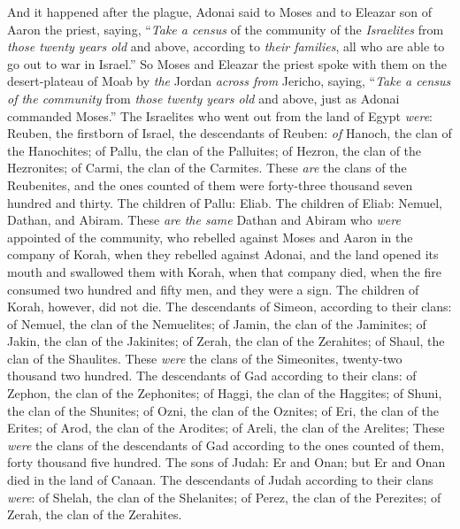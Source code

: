 \begin{biblechapter} %
  And it happened after the plague, Adonai said to Moses and to Eleazar son of Aaron the priest, saying,
\verse “\textit{Take a census} of the community of the \textit{Israelites} from \textit{those twenty years old} and above, according to \textit{their families}, all who are able to go out to war in Israel.”
\verse So Moses and Eleazar the priest spoke with them on the desert-plateau of Moab by \textit{the} Jordan \textit{across from} Jericho, saying,
\verse “\textit{Take a census of the community} from \textit{those twenty years old} and above, just as Adonai commanded Moses.” The Israelites who went out from the land of Egypt \textit{were}:
\verse Reuben, the firstborn of Israel, the descendants of Reuben: \textit{of} Hanoch, the clan of the Hanochites; of Pallu, the clan of the Palluites;
\verse of Hezron, the clan of the Hezronites; of Carmi, the clan of the Carmites.
\verse These \textit{are} the clans of the Reubenites, and the ones counted of them were forty-three thousand seven hundred and thirty.
\verse The children of Pallu: Eliab.
\verse The children of Eliab: Nemuel, Dathan, and Abiram. These \textit{are the same} Dathan and Abiram who \textit{were} appointed of the community, who rebelled against Moses and Aaron in the company of Korah, when they rebelled against Adonai,
\verse and the land opened its mouth and swallowed them with Korah, when that company died, when the fire consumed two hundred and fifty men, and they were a sign.
\verse The children of Korah, however, did not die.
\verse The descendants of Simeon, according to their clans: of Nemuel, the clan of the Nemuelites; of Jamin, the clan of the Jaminites; of Jakin, the clan of the Jakinites;
\verse of Zerah, the clan of the Zerahites; of Shaul, the clan of the Shaulites.
\verse These \textit{were} the clans of the Simeonites, twenty-two thousand two hundred.
\verse The descendants of Gad according to their clans: of Zephon, the clan of the Zephonites; of Haggi, the clan of the Haggites; of Shuni, the clan of the Shunites;
\verse of Ozni, the clan of the Oznites; of Eri, the clan of the Erites;
\verse of Arod, the clan of the Arodites; of Areli, the clan of the Arelites;
\verse These \textit{were} the clans of the descendants of Gad according to the ones counted of them, forty thousand five hundred.
\verse The sons of Judah: Er and Onan; but Er and Onan died in the land of Canaan.
\verse The descendants of Judah according to their clans \textit{were}: of Shelah, the clan of the Shelanites; of Perez, the clan of the Perezites; of Zerah, the clan of the Zerahites.

\end{biblechapter}
